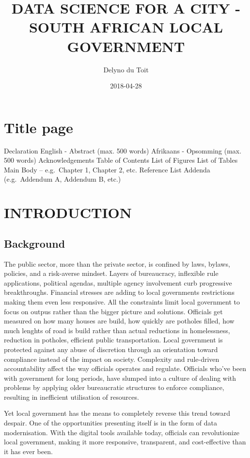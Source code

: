 \documentclass[]{book}
\title{DATA SCIENCE FOR A CITY - SOUTH AFRICAN LOCAL GOVERNMENT}
\author{Delyno du Toit}
\date{2018-04-28}
\theoremstyle{definition}
\theoremstyle{definition}
\theoremstyle{definition}
\theoremstyle{remark}
\begin{document}
\maketitle

{
\setcounter{tocdepth}{1}
\tableofcontents
}
\chapter{Title page}\label{title-page}

Declaration English - Abstract (max. 500 words) Afrikaans - Opsomming
(max. 500 words) Acknowledgements Table of Contents List of Figures List
of Tables Main Body -- e.g.~Chapter 1, Chapter 2, etc. Reference List
Addenda (e.g.~Addendum A, Addendum B, etc.)

\chapter{INTRODUCTION}\label{introduction}

\section{Background}\label{background}

The public sector, more than the private sector, is confined by laws,
bylaws, policies, and a risk-averse mindset. Layers of bureaucracy,
inflexible rule applications, political agendas, multiple agency
involvement curb progressive breakthroughs. Financial stresses are
adding to local governments restrictions making them even less
responsive. All the constraints limit local government to focus on
outpus rather than the bigger picture and solutions. Officials get
measured on how many houses are build, how quickly are potholes filled,
how much lenghts of road is build rather than actual reductions in
homelessness, reduction in potholes, efficient public transportation.
Local government is protected against any abuse of discretion through an
orientation toward compliance instead of the impact on society.
Complexity and rule-driven accountability affect the way officials
operates and regulate. Officials who've been with government for long
periods, have slumped into a culture of dealing with problems by
applying older bureaucratic structures to enforce compliance, resulting
in inefficient utilisation of resources.

Yet local government has the means to completely reverse this trend
toward despair. One of the opportunities presenting itself is in the
form of data modernisation. With the digital tools available today,
officials can revolutionize local government, making it more responsive,
transparent, and cost-effective than it has ever been.
\end{document}
